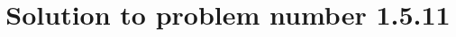 \documentclass[journal,12pt,twocolumn]{IEEEtran}
\theoremstyle{remark}
\begin{document}
%




\vspace{3cm}

\title{
    Solution to problem number 1.5.11
}


%
%
%

% 
%



% 
\end{document}
